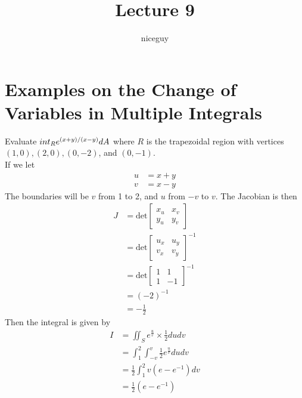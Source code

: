 \documentclass[12pt]{article}
\author{niceguy}
\title{Lecture 9}
\begin{document}
\maketitle

\section{Examples on the Change of Variables in Multiple Integrals}

\begin{ex}
	Evaluate $\\int_R e^{(x+y)/(x-y)}dA$ where $R$ is the trapezoidal region with vertices $(1,0), (2,0), (0,-2)$, and $(0,-1)$. \\
	If we let
	\begin{align*}
		u &= x+y \\
		v &= x-y
	\end{align*}
	The boundaries will be $v$ from 1 to 2, and $u$ from $-v$ to $v$. The Jacobian is then
	\begin{align*}
		J &= \text{det} \begin{bmatrix} x_u & x_v \\ y_u & y_v \end{bmatrix} \\
		  &= \text{det} \begin{bmatrix} u_x & u_y \\ v_x & v_y \end{bmatrix}^{-1} \\
		  &= \text{det} \begin{bmatrix} 1 & 1 \\ 1 & -1 \end{bmatrix}^{-1} \\
		  &= (-2)^{-1} \\
		  &= -\frac{1}{2}
	\end{align*}
	Then the integral is given by
	\begin{align*}
		I &= \iint_S e^{\frac{u}{v}} \times \frac{1}{2} dudv \\
		  &= \int_1^2 \int_{-v}^v \frac{1}{2} e^{\frac{u}{v}} dudv \\
		  &= \frac{1}{2} \int_1^2 v(e-e^{-1})dv \\
		  &= \frac{1}{2}(e-e^{-1})
	\end{align*}
\end{ex}
\end{document}
